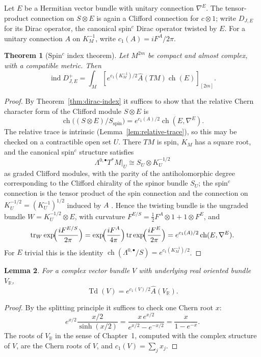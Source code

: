 \documentclass[11pt,oneside,reqno]{book}
\newcommand{\R}{\mathbb R}
\newcommand{\Ahat}{\widehat A}
\theoremstyle{plain}
\newtheorem{theorem}{Theorem}[chapter]
\newtheorem{lemma}[theorem]{Lemma}
\theoremstyle{definition}
\theoremstyle{remark}
\begin{document}
Let \(E\) be a Hermitian vector bundle with unitary connection
\(\nabla^E\).  The tensor-product connection on \(S\otimes E\) is again a
Clifford connection for \(c\otimes1\); write \(D_{J,E}\) for its Dirac
operator, the canonical spin\(^{c}\) Dirac operator twisted by \(E\).  For
a unitary connection \(A\) on \(K_M^{-1}\), write
\(c_1(A)=iF^A/2\pi\).

\begin{theorem}[Spin\(^{c}\) index theorem]\label{thm:spinc-index}
Let \(M^{2m}\) be compact and almost complex, with a compatible metric.
Then
\[
 \operatorname{ind}D_{J,E}^+
 =
 \int_M
 \left[
 e^{c_1(K_M^{-1})/2}\Ahat(TM)\operatorname{ch}(E)
 \right]_{[2m]}.
\]
\end{theorem}

\begin{proof}
By Theorem~\ref{thm:dirac-index} it suffices to show that the relative
Chern character form of the Clifford module \(S\otimes E\) is
\[
 \operatorname{ch}\bigl((S\otimes E)/S_{\mathrm{spin}}\bigr)
 =e^{c_1(A)/2}\operatorname{ch}(E,\nabla^E).
\]
The relative trace is intrinsic (Lemma~\ref{lem:relative-trace}), so this may be
checked on a contractible open set \(U\).  There \(TM\) is spin, \(K_M\)
has a square root, and the canonical spin\(^{c}\) structure satisfies
\[
 \Lambda^{0,\bullet}T^*M|_U\cong S_U\otimes K_U^{-1/2}
\]
as graded Clifford modules, with the parity of the antiholomorphic degree
corresponding to the Clifford chirality of the spinor bundle \(S_U\); the
spin\(^{c}\) connection is the tensor product of the spin connection and
the connection on \(K_U^{-1/2}=(K_U^{-1})^{1/2}\) induced by \(A\)
\cite[Appendix~D]{LM}.  Hence the twisting bundle is the ungraded bundle
\(W=K_U^{-1/2}\otimes E\), with curvature
\(F^{E/S}=\tfrac12F^A\otimes1+1\otimes F^E\), and
\[
 \operatorname{tr}_W\exp\!\Bigl(\frac{iF^{E/S}}{2\pi}\Bigr)
 =\exp\!\Bigl(\frac{iF^A}{4\pi}\Bigr)
  \operatorname{tr}\exp\!\Bigl(\frac{iF^E}{2\pi}\Bigr)
 =e^{c_1(A)/2}\operatorname{ch}(E,\nabla^E).
\]
For \(E\) trivial this is the identity
\(\operatorname{ch}(\Lambda^{0,\bullet}/S)=e^{c_1(K_M^{-1})/2}\).
\end{proof}

\begin{lemma}\label{lem:todd-ahat}
For a complex vector bundle \(V\) with underlying real oriented bundle
\(V_\R\),
\[
 \operatorname{Td}(V)=e^{c_1(V)/2}\Ahat(V_\R).
\]
\end{lemma}

\begin{proof}
By the splitting principle it suffices to check one Chern root \(x\):
\[
 e^{x/2}\frac{x/2}{\sinh(x/2)}
 =\frac{x\,e^{x/2}}{e^{x/2}-e^{-x/2}}
 =\frac{x}{1-e^{-x}}.
\]
The roots of \(V_\R\) in the sense of Chapter~1, computed with the complex
structure of \(V\), are the Chern roots of \(V\), and
\(c_1(V)=\sum_jx_j\).
\end{proof}
\end{document}

